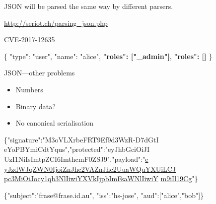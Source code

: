\documentclass[ignorenonframetext,aspectratio=43]{beamer}
\providecommand{\tightlist}{%
  \setlength{\itemsep}{0pt}\setlength{\parskip}{0pt}}
\newenvironment{Shaded}{}{}
\begin{document}
\begin{frame}[plain]
\huge
JSON will be parsed the same way by different parsers.
\end{frame}

\begin{frame}[plain]
\begin{center}
\end{center}
\tiny \url{http://seriot.ch/parsing_json.php}
\end{frame}

\begin{frame}
\centering
\LARGE
CVE-2017-12635
\end{frame}

\begin{frame}[fragile]
\Large
\begin{Shaded}
\begin{Highlighting}[]
\{
  "type": "user",
  "name": "alice",
  \textbf{"roles": ["_admin"]},
  \textbf{"roles": []}
\}
\end{Highlighting}
\end{Shaded}
\end{frame}

\begin{frame}{JSON---other problems}
\begin{itemize}
\tightlist
\item Numbers
\item Binary data?
\item No canonical serialisation
\end{itemize}
\end{frame}

\begin{frame}[fragile]
\Large
\begin{Shaded}
\begin{Highlighting}[]
\{"signature":"M3oVLXrbeFRT9Ef9d3WzR-D7dGtI
eYoPBYmiCdtYqus","protected":"eyJhbGciOiJI
UzI1NiIsImtpZCI6ImthcmF0ZSJ9","payload":"\underline{e}
\underline{yJzdWJqZWN0IjoiZnJhc2VAZnJhc2UuaWQuYXUiLCJ}
\underline{pc3MiOiJocy1qb3NlIiwiYXVkIjpbImFsaWNlIiwiY}
\underline{m9iIl19Cg}"\}
\end{Highlighting}
\end{Shaded}
\end{frame}

\begin{frame}[fragile]
\begin{Shaded}
\begin{Highlighting}[]
\{"subject":"frase@frase.id.au",
  "iss":"hs-jose",
  "aud":["alice","bob"]\}
\end{Highlighting}
\end{Shaded}
\end{frame}
\end{document}
